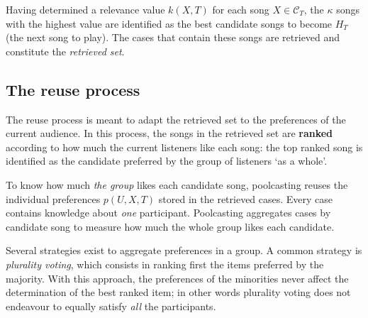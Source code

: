 Having determined a relevance value $k(X,T)$ for each song $X \in \mathcal{C}_T$, the $\kappa$ songs with the highest value are identified as the best candidate songs to become $H_T$ (the next song to play).
The cases that contain these songs are retrieved and constitute the \emph{retrieved set}.


\subsection{The reuse process} %
\label{sub:the_reuse_process3}

The reuse process is meant to adapt the retrieved set to the preferences of the current audience. %
In this process, the songs in the retrieved set are \textbf{ranked} according to how much the current listeners like each song: %
the top ranked song is identified as the candidate preferred by the group of listeners `as a whole'.

To know how much \emph{the group} likes each candidate song, poolcasting reuses the individual preferences $p(U,X,T)$ stored in the retrieved cases.
Every case contains knowledge about \emph{one} participant.
Poolcasting aggregates cases by candidate song to measure how much the whole group likes each candidate.



Several strategies exist to aggregate preferences in a group. %
A common strategy is \emph{plurality voting}, which consists in ranking first the items preferred by the majority. 
With this approach, the preferences of the minorities never affect the determination of the best ranked item; in other words plurality voting does not endeavour to equally satisfy \emph{all} the participants.


